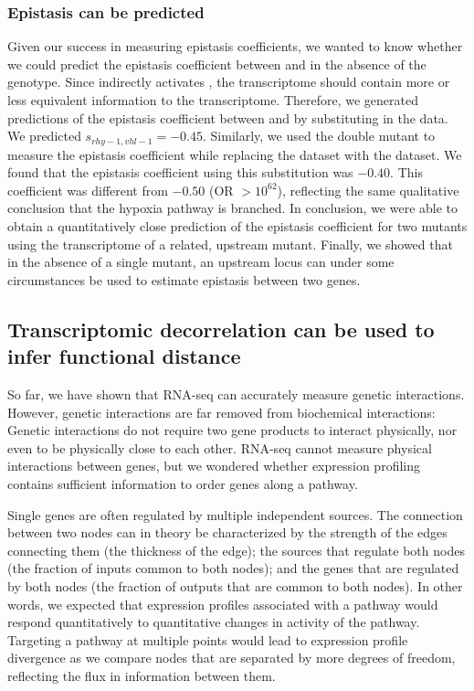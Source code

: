 \subsubsection*{Epistasis can be predicted}
Given our success in measuring epistasis coefficients, we wanted to know whether
we could predict the epistasis coefficient between  and 
in the absence of the \egl{} genotype. Since \rhyp{} indirectly activates
\eglp{}, the \rhy{} transcriptome should contain more or less
equivalent information to the \egl{} transcriptome. Therefore, we generated
predictions of the epistasis coefficient between  and 
by substituting in the \rhy{} data. We predicted $s_{rhy-1,vhl-1} = -0.45$.
Similarly, we used the \eglvhl{} double mutant to
measure the epistasis coefficient while replacing the \egl{} dataset with the \rhy{}
dataset. We found that the epistasis coefficient using this substitution was $-0.40$.
This coefficient was different from $-0.50$ (OR $>10^{62}$), reflecting the same
qualitative conclusion that the hypoxia pathway is branched.
In conclusion, we were able to obtain a quantitatively close prediction of the
epistasis coefficient for two mutants using the transcriptome of a related,
upstream mutant. Finally, we showed that in the absence of a single mutant, an
upstream locus can under some circumstances be used to estimate epistasis
between two genes.


\subsection*{Transcriptomic decorrelation can be used to infer functional distance}
\label{sub:decorrelation}
So far, we have shown that RNA-seq can accurately measure genetic interactions.
However, genetic interactions are far removed from biochemical interactions:
Genetic interactions do not require two gene products to interact physically, nor
even to be physically close to each other. RNA-seq cannot measure physical
interactions between genes, but we wondered whether expression profiling contains
sufficient information to order genes along a pathway.

Single
genes are often regulated by multiple independent sources. The connection between
two nodes can in theory be characterized by the strength of the edges connecting
them (the thickness of the edge); the sources that regulate both
nodes (the fraction of inputs common to both nodes); and the genes that are
regulated by both nodes (the fraction of outputs that are common to both nodes).
In other words, we expected that expression profiles associated with a pathway
would respond quantitatively to quantitative changes in activity of the pathway.
Targeting a pathway at multiple points would lead to expression profile
divergence as we compare nodes that are separated by more degrees of freedom,
reflecting the flux in information between them.

